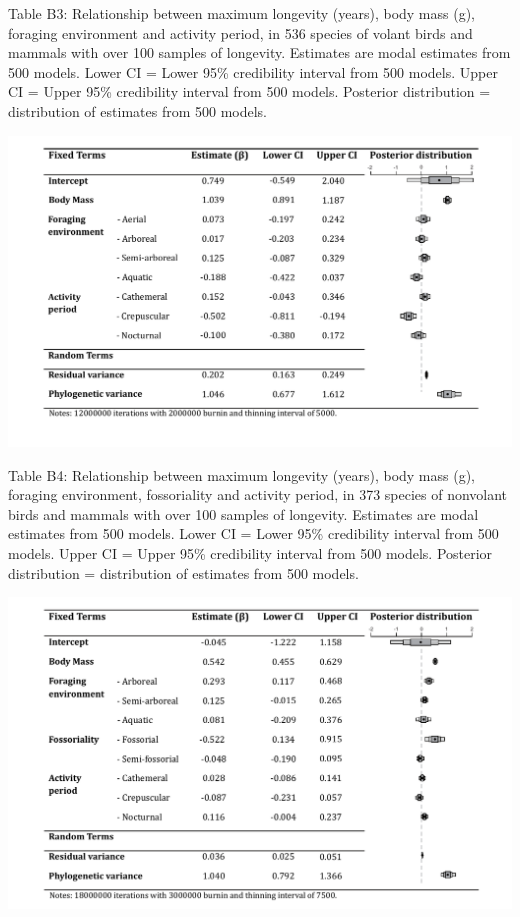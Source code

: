 \begin{table}[!h]
  \caption[ ]{Table B3: Relationship between maximum longevity (years), body mass (g), foraging environment and activity period, in 536 species of volant birds and mammals with over 100 samples of longevity. Estimates are modal estimates from 500 models. Lower CI = Lower 95\% credibility interval from 500 models. Upper CI = Upper 95\% credibility interval from 500 models. Posterior distribution = distribution of estimates from 500 models.}
  \label{tbl:Table B3.}
  \includegraphics[width=\linewidth]{ch3-longevity-appendix/Table_B3.pdf}
\end{table}


\begin{table}[!h]
  \caption[ ]{Table B4: Relationship between maximum longevity (years), body mass (g), foraging environment, fossoriality and activity period, in 373 species of nonvolant birds and mammals with over 100 samples of longevity. Estimates are modal estimates from 500 models. Lower CI = Lower 95\% credibility interval from 500 models. Upper CI = Upper 95\% credibility interval from 500 models. Posterior distribution = distribution of estimates from 500 models.}
  \label{tbl:Table B4.}
  \includegraphics[width=\linewidth]{ch3-longevity-appendix/Table_B4.pdf}
\end{table}



